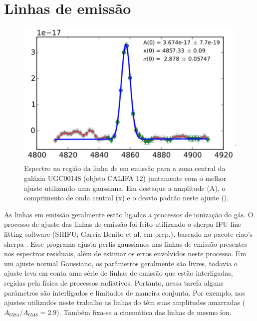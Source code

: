 \section{Linhas de emissão}
\label{sec:sample:eml}
\begin{figure}
	\centering
	\includegraphics[scale=0.4]{figuras/K0012-zone0-Hb.pdf}
	\caption[Exemplo de ajuste de linha de emissão]
	{Espectro na região da linha de \Hbeta em emissão para a zona central da galáxia UGC00148 (objeto
CALIFA 12) juntamente com o melhor ajuste utilizando uma gaussiana. Em destaque a amplitude (A), o
comprimento de onda central (x) e o desvio padrão neste ajuste (\sigma).}
	\label{fig:rgbline}
\end{figure}

As linhas em emissão geralmente estão ligadas a processos de ionização do gás. O processo de ajuste das linhas de emissão foi feito utilizando o {\sc sherpa} IFU line fitting software (SHIFU; García-Benito et al. em prep.), baseado no pacote {\sc ciao's sherpa} \citep{Freeman.etal.2001, Doe.etal.2007}. Esse programa ajusta perfis gaussianos nas linhas de emissão presentes nos espectros residuais, além de estimar os erros envolvidos neste processo. Em um ajuste normal Gaussiano, os parâmetros geralmente são livres, todavia o ajuste leva em conta uma série de linhas de emissão que estão interligadas, regidas pela física de processos radiativos. Portanto, nessa tarefa alguns parâmetros são interligados e limitados de maneira conjunta. Por exemplo, nos ajustes utilizados neste trabalho as linhas do \nii têm suas amplitudes amarradas ($A_{6584}/A_{6548} = 2.9$). Também fixa-se a cinemática das linhas de mesmo íon.

